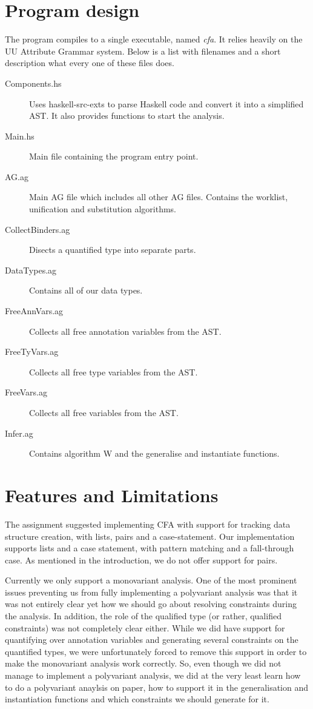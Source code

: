 \documentclass[a4paper]{article}
\begin{document}
\section{Program design}
The program compiles to a single executable, named \emph{cfa}. It relies heavily
on the UU Attribute Grammar system. Below is a list with filenames and a short
description what every one of these files does.

\begin{description}
\item [Components.hs] Uses haskell-src-exts to parse Haskell code and convert
it into a simplified AST. It also provides functions to start the analysis.
\item [Main.hs] Main file containing the program entry point.
\item [AG.ag] Main AG file which includes all other AG files. Contains the worklist,
unification and substitution algorithms.
\item [CollectBinders.ag] Disects a quantified type into separate parts.
\item [DataTypes.ag] Contains all of our data types.
\item [FreeAnnVars.ag] Collects all free annotation variables from the AST.
\item [FreeTyVars.ag] Collects all free type variables from the AST.
\item [FreeVars.ag] Collects all free variables from the AST.
\item [Infer.ag] Contains algorithm W and the generalise and instantiate functions.
\end{description}

\section{Features and Limitations}

The assignment suggested implementing CFA with support for tracking data structure
creation, with lists, pairs and a case-statement. Our implementation supports lists and 
a case statement, with pattern matching and a fall-through case. As mentioned in
the introduction, we do not offer support for pairs.

Currently we only support a monovariant analysis. One of the most prominent issues
preventing us from fully implementing a polyvariant analysis was that it was not
entirely clear yet how we should go about resolving constraints during the analysis.
In addition, the role of the qualified type (or rather, qualified constraints)
was not completely clear either. While we did have support for quantifying over
annotation variables and generating several constraints on the quantified types,
we were unfortunately forced to remove this support in order to make the monovariant
analysis work correctly. So, even though we did not manage to implement a polyvariant
analysis, we did at the very least learn how to do a polyvariant anaylsis on paper,
how to support it in the generalisation and instantiation functions and which 
constraints we should generate for it.
\end{document}
